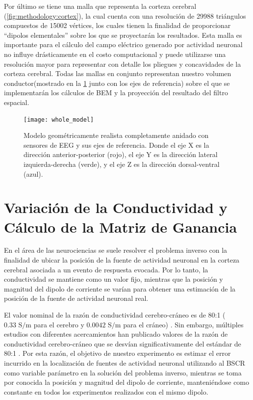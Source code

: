 Por último se tiene una malla que representa la corteza cerebral (\cref{fig:methodology:cortex}), la cual cuenta con una resolución de 29988 triángulos compuestos de 15002 vértices, los cuales tienen la finalidad de proporcionar ``dipolos elementales'' sobre los que se proyectarán los resultados. 
Esta malla es importante para el cálculo del campo eléctrico generado por actividad neuronal no influye drásticamente en el costo computacional y puede utilizarse una resolución mayor para representar con detalle los pliegues y concavidades de la corteza cerebral.
Todas las mallas en conjunto representan nuestro volumen conductor(mostrado en la \cref{fig:methodology:model} junto con los ejes de referencia) sobre el que se implementarán los cálculos de BEM y la proyección del resultado del filtro espacial. 

\begin{figure}[bp]
	\texttt{[image: whole\_model]}
	\caption{Modelo geométricamente realista completamente anidado con sensores de EEG y sus ejes de referencia. Donde el eje X es la dirección anterior-posterior (rojo), el eje Y es la dirección lateral izquierda-derecha (verde), y el eje Z es la dirección dorsal-ventral (azul).}
	\label{fig:methodology:model}
\end{figure}

\section{Variación de la Conductividad y Cálculo de la Matriz de Ganancia}
\label{sec:methodology:openmeeg}

En el área de las neurociencias se suele resolver el problema inverso con la finalidad de ubicar la posición de la fuente de actividad neuronal en la corteza cerebral asociada a un evento de respuesta evocada. 
Por lo tanto, la conductividad se mantiene como un valor fijo, mientras que la posición y magnitud del dipolo de corriente se varían para obtener una estimación de la posición de la fuente de actividad neuronal real. 

El valor nominal de la razón de conductividad cerebro-cráneo es de 80:1 ($0.33\text{ S/m}$ para el cerebro y $0.0042 \text{ S/m}$ para el cráneo) \cite{Rush1968,Rush1969,Cohen1983}.
Sin embargo, múltiples estudios con diferentes acercamientos han publicado valores de la razón de conductividad cerebro-cráneo que se desvían significativamente del estándar de 80:1 \cite{McCann2019}.
Por esta razón, el objetivo de nuestro experimento es estimar el error incurrido en la localización de fuentes de actividad neuronal utilizando al BSCR como variable parámetro en la solución del problema inverso, mientras se toma por conocida la posición y magnitud del dipolo de corriente, manteniéndose como constante en todos los experimentos realizados con el mismo dipolo.

